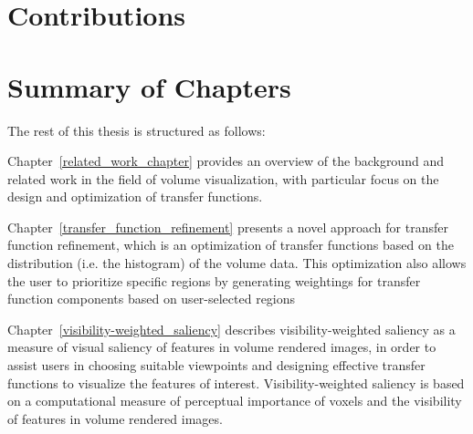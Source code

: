 %
%


\section{Contributions}

\section{Summary of Chapters}
The rest of this thesis is structured as follows:

Chapter~\ref{related_work_chapter}
provides an overview of the background and related work in the field of volume visualization, with particular focus on the design and optimization of transfer functions.

Chapter~\ref{transfer_function_refinement}
presents a novel approach for transfer function refinement, which is an optimization of transfer functions based on the distribution (i.e. the histogram) of the volume data. This optimization also allows the user to prioritize specific regions by generating weightings for transfer function components based on user-selected regions

Chapter~\ref{visibility-weighted_saliency}
describes visibility-weighted saliency as a measure of visual saliency of features in volume rendered images, in order to assist users in choosing suitable viewpoints and designing effective transfer functions to visualize the features of interest. Visibility-weighted saliency is based on a computational measure of perceptual importance of voxels and the visibility of features in volume rendered images.

